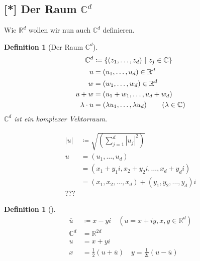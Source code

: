\documentclass[11pt, twoside, a4paper]{article}
\theoremstyle{plain}
\newtheorem{definition}[blockelement]{Definition}
\newcommand{\set}[1]{\left\{#1\right\}}
\newcommand{\pair}[1]{\left(#1\right)}
\newcommand{\abs}[1]{\left\lvert#1\right\rvert}
\newcommand{\definedas}[0]{\coloneqq}
\newcommand{\R}{\mathbb{R}}
\newcommand{\C}{\mathbb{C}}
\begin{document}
    \newpage


    \subsection{[*] Der Raum $\C^d$}

    \marginnote{[21. Dez]}
    Wie $\R^d$ wollen wir nun auch $\C^d$ definieren.

    \begin{definition}[Der Raum $\C^d$]
        \begin{align*}
            \C^d &\definedas \set{\pair{z_1, \dots, z_d} ~\middle | ~ z_j \in\C}\\
            u &= \pair{u_1, \dots, u_d} \in\R^d\\
            w &= \pair{w_1, \dots, w_d} \in\R^d\\
            u+w &= \pair{u_1+w_1,\dots,u_d+w_d}\\
            \lambda\cdot u &= \pair{\lambda u_1,\dots,\lambda u_d}\tag{$\lambda\in\C$}
        \end{align*}
        $\C^d$ ist ein komplexer Vektorraum.

        \begin{align*}
            \abs{u} &\definedas \sqrt{\pair{\sum_{j=1}^{d} \abs{u_j}^2}}\tag{Euklidische Länge}\\
            u &= \pair{u_1, \dots, u_d}\\
            &= \pair{x_1+y_1i, x_2 + y_2 i,\dots, x_d + y_d i}\\
            &= \pair{x_1, x_2,\dots,x_d} + \pair{y_1,y_2,\dots,y_d}i\\
            ???
        \end{align*}
    \end{definition}

    \begin{definition}[]
        \begin{align*}
            \overline{u} &\definedas x - yi\quad (u=x+iy, x,y\in\R^d)\\
            \C^d &= \R^{2d}\\[10pt]
            u &= x + yi\\
            x &= \frac{1}{2}\pair{u+\overline{u}}\quad y = \frac{1}{2i}\pair{u-\overline{u}}
        \end{align*}
    \end{definition}
\end{document}
